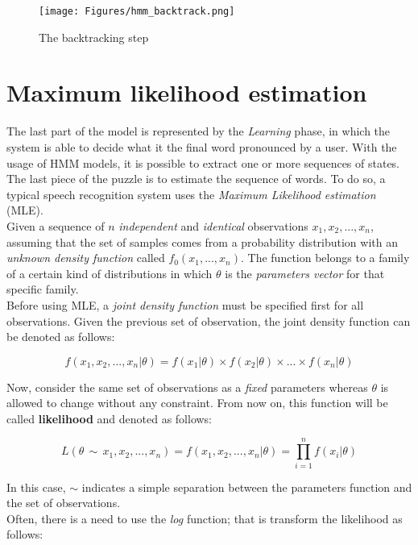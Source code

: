 \begin{figure}[!ht]
	\centering
	\texttt{[image: Figures/hmm\_backtrack.png]}
	\caption{The backtracking step}
	\label{fig:hmm_backtrack}
\end{figure}


\section{Maximum likelihood estimation}
\label{sec:mle}
The last part of the model is represented by the \textit{Learning} phase, in which the system is able to decide what it the final word pronounced by a user. With the usage of HMM models, it is possible to extract one or more sequences of states. The last piece of the puzzle is to estimate the sequence of words. To do so, a typical speech recognition system uses the \textit{Maximum Likelihood estimation} (MLE). \\

\noindent Given a sequence of $n$ \textit{independent} and \textit{identical} observations $x_{1}, x_{2}, ... , x_{n}$, assuming that the set of samples comes from a probability distribution with an \textit{unknown density function} called $f_{0}(x_{1}, ... , x_{n})$. The function belongs to a family of a certain kind of distributions in which $\theta$ is the \textit{parameters vector} for that specific family. \\

\noindent Before using MLE, a \textit{joint density function} must be specified first for all observations. Given the previous set of observation, the joint density function can be denoted as follows:

\begin{equation}
	f (x_{1}, x_{2}, ... , x_{n} | \theta) = f(x_{1} | \theta) \times f(x_{2} | \theta) \times ... \times f(x_{n} | \theta)
\end{equation}

\noindent Now, consider the same set of observations as a \textit{fixed} parameters whereas $\theta$ is allowed to change without any constraint. From now on, this function will be called \textbf{likelihood} and denoted as follows:

\begin{equation}
	L(\theta \, \sim \, x_{1}, x_{2}, ... , x_{n}) = f (x_{1}, x_{2}, ... , x_{n} | \theta) = \prod_{i=1}^{n} f (x_{i} | \theta)
\end{equation}

\noindent In this case, $\sim$ indicates a simple separation between the parameters function and the set of observations. \\
\noindent Often, there is a need to use the \textit{log} function; that is transform the likelihood as follows:

